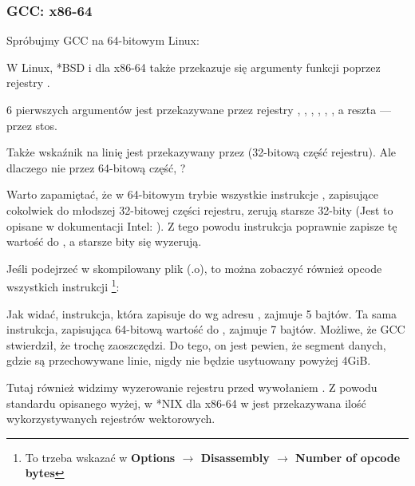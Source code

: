 \subsubsection{GCC: x86-64}

Spróbujmy GCC na 64-bitowym Linux:



W Linux, *BSD i \MacOSX dla x86-64 także przekazuje się argumenty funkcji poprzez rejestry \SysVABI.

6 pierwszych argumentów jest przekazywane przez rejestry \RDI, \RSI, \RDX, \RCX, , , a reszta --- przez stos.

Także wskaźnik na linię jest przekazywany przez \EDI (32-bitową część rejestru).
Ale dlaczego nie przez 64-bitową część, \RDI?

Warto zapamiętać, że w 64-bitowym trybie wszystkie instrukcje \MOV, zapisujące cokolwiek do młodszej 32-bitowej części rejestru, zerują starsze 32-bity (Jest to opisane w dokumentacji Intel: ).
Z tego powodu instrukcja  poprawnie zapisze tę wartość do \RAX, a starsze bity się wyzerują.

Jeśli podejrzeć w \IDA skompilowany plik (.o), to można zobaczyć również opcode wszystkich instrukcji
\footnote{To trzeba wskazać w \textbf{Options $\rightarrow$ Disassembly $\rightarrow$ Number of opcode bytes}}:



\label{hw_EDI_instead_of_RDI}
Jak widać, instrukcja, która zapisuje do \EDI wg adresu , zajmuje 5 bajtów.
Ta sama instrukcja, zapisująca 64-bitową wartość do \RDI, zajmuje 7 bajtów.
Możliwe, że GCC stwierdził, że trochę zaoszczędzi.
Do tego, on jest pewien, że segment danych, gdzie są przechowywane linie, nigdy nie będzie usytuowany powyżej 4\gls{GiB}.

\label{SysVABI_input_EAX}
Tutaj również widzimy wyzerowanie rejestru \EAX przed wywołaniem \printf.
Z powodu standardu opisanego wyżej, w *NIX dla x86-64 w \EAX jest przekazywana ilość wykorzystywanych rejestrów wektorowych.


